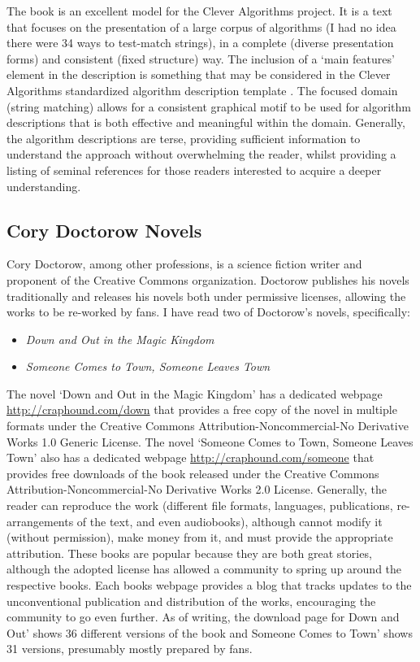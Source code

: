 \documentclass[a4paper, 11pt]{article}
\begin{document}
The book is an excellent model for the Clever Algorithms project. It is a text that focuses on the presentation of a large corpus of algorithms (I had no idea there were 34 ways to test-match strings), in a complete (diverse presentation forms) and consistent (fixed structure) way. The inclusion of a `main features' element in the description is something that may be considered in the Clever Algorithms standardized algorithm description template \cite{Brownlee2010a}. The focused domain (string matching) allows for a consistent graphical motif to be used for algorithm descriptions that is both effective and meaningful within the domain. Generally, the algorithm descriptions are terse, providing sufficient information to understand the approach without overwhelming the reader, whilst providing a listing of seminal references for those readers interested to acquire a deeper understanding. 

% 
% 
\subsection{Cory Doctorow Novels}
\label{subsec:doctorow}
Cory Doctorow, among other professions, is a science fiction writer and proponent of the Creative Commons organization. Doctorow publishes his novels traditionally and releases his novels both under permissive licenses, allowing the works to be re-worked by fans. I have read two of Doctorow's novels, specifically: 

\begin{itemize}
	\item \emph{Down and Out in the Magic Kingdom} \cite{Doctorow2003}
	\item \emph{Someone Comes to Town, Someone Leaves Town} \cite{Doctorow2006}
\end{itemize}

The novel `Down and Out in the Magic Kingdom' has a dedicated webpage \url{http://craphound.com/down} that provides a free copy of the novel in multiple formats under the Creative Commons Attribution-Noncommercial-No Derivative Works 1.0 Generic License. The novel `Someone Comes to Town, Someone Leaves Town' also has a dedicated webpage \url{http://craphound.com/someone} that provides free downloads of the book released under the Creative Commons Attribution-Noncommercial-No Derivative Works 2.0 License. Generally, the reader can reproduce the work (different file formats, languages, publications, re-arrangements of the text, and even audiobooks), although cannot modify it (without permission), make money from it, and must provide the appropriate attribution. These books are popular because they are both great stories, although the adopted license has allowed a community to spring up around the respective books. Each books webpage provides a blog that tracks updates to the unconventional publication and distribution of the works, encouraging the community to go even further. As of writing, the download page for Down and Out' shows 36 different versions of the book and Someone Comes to Town' shows 31 versions, presumably mostly prepared by fans.
\end{document}
